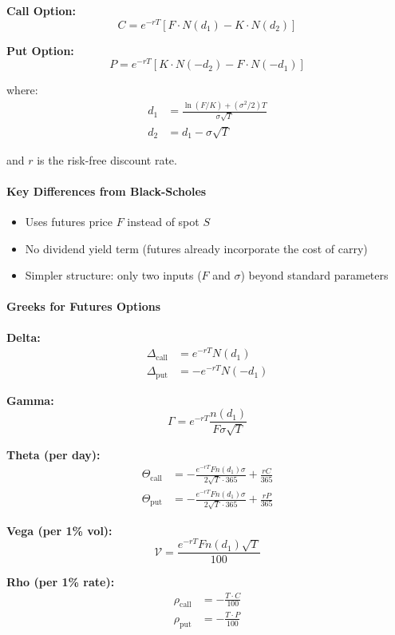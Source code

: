 \textbf{Call Option:}
\[
C = e^{-rT} \left[ F \cdot N(d_1) - K \cdot N(d_2) \right]
\]

\textbf{Put Option:}
\[
P = e^{-rT} \left[ K \cdot N(-d_2) - F \cdot N(-d_1) \right]
\]

where:
\begin{align*}
d_1 &= \frac{\ln(F/K) + (\sigma^2/2)T}{\sigma \sqrt{T}} \\
d_2 &= d_1 - \sigma \sqrt{T}
\end{align*}

and $r$ is the risk-free discount rate.

\paragraph{Key Differences from Black-Scholes}

\begin{itemize}
  \item Uses futures price $F$ instead of spot $S$
  \item No dividend yield term (futures already incorporate the cost of carry)
  \item Simpler structure: only two inputs ($F$ and $\sigma$) beyond standard parameters
\end{itemize}

\paragraph{Greeks for Futures Options}

\textbf{Delta:}
\begin{align*}
\Delta_{\text{call}} &= e^{-rT} N(d_1) \\
\Delta_{\text{put}} &= -e^{-rT} N(-d_1)
\end{align*}

\textbf{Gamma:}
\[
\Gamma = e^{-rT} \frac{n(d_1)}{F \sigma \sqrt{T}}
\]

\textbf{Theta (per day):}
\begin{align*}
\Theta_{\text{call}} &= -\frac{e^{-rT} F n(d_1) \sigma}{2\sqrt{T} \cdot 365} + \frac{rC}{365} \\
\Theta_{\text{put}} &= -\frac{e^{-rT} F n(d_1) \sigma}{2\sqrt{T} \cdot 365} + \frac{rP}{365}
\end{align*}

\textbf{Vega (per 1\% vol):}
\[
\mathcal{V} = \frac{e^{-rT} F n(d_1) \sqrt{T}}{100}
\]

\textbf{Rho (per 1\% rate):}
\begin{align*}
\rho_{\text{call}} &= -\frac{T \cdot C}{100} \\
\rho_{\text{put}} &= -\frac{T \cdot P}{100}
\end{align*}

